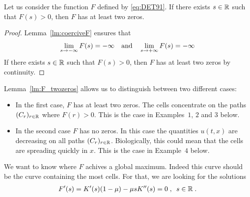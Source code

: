     \begin{lemma}
    \label{lm:F_twozeros}
    Let us consider the function $F$ defined by \eqref{eq:DET91}. If there exists $s \in \mathbb{R}$ such that $F(s) > 0$, then $F$ has at least two zeros.  
    \end{lemma}
    \begin{proof}
        Lemma~\ref{lm:coerciveF} ensures that 
        \begin{equation*}
            \lim_{s \to -\infty} F(s) = -\infty 
            \quad \text{and} \quad
            \lim_{s \to +\infty} F(s) = -\infty 
        \end{equation*}
        If there exists $s \in \mathbb{R}$ such that $F(s) > 0$, then $F$ has at least two zeros by continuity. 
    \end{proof}

    Lemma~\ref{lm:F_twozeros} allows us to distinguish between two different cases:
    \begin{itemize}
        \item In the first case, $F$ has at least two zeros. The cells concentrate on the paths $(C_r)_{r\in\mathbb{R}}$ where $F(r)> 0$. This is the case in Examples~$1$, $2$ and $3$ below. 
        \item In the second case $F$ has no zeros. In this case the quantities $u(t,x)$ are decreasing on all paths $(C_r)_{r \in \mathbb{R}}$. Biologically, this could mean that the cells are spreading quickly in $x$. This is the case in Example~$4$ below. 
    \end{itemize}

    We want to know where $F$ achives a global maximum. Indeed this curve should be the curve containing the most cells. For that, we are looking for the solutions
    \begin{align*}
        F'(s) = K'(s) (1-\mu) - \mu s K''(s) = 0
        \; , \enspace
        s \in \mathbb{R}
        \; .
    \end{align*}



